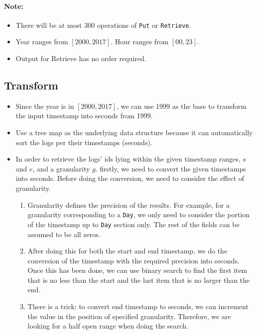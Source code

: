\paragraph{Note:}

\begin{itemize}
\item There will be at most 300 operations of \texttt{Put} or \texttt{Retrieve}.
\item Year ranges from $[2000,2017]$. Hour ranges from $[00,23]$.
\item Output for Retrieve has no order required.
\end{itemize}

\subsection{Transform}
\begin{itemize}
\item Since the year is in $[2000,2017]$, we can use 1999 as the base to transform the input timestamp into seconds from 1999.
\item Use a tree map as the underlying data structure because it can automatically sort the logs per their timestamps (seconds).
\item In order to retrieve the logs' ids lying within the given timestamp ranges, $s$ and $e$, and a granularity $g$. firstly, we need to convert the given timestamps into seconds. Before doing the conversion, we need to consider the effect of granularity.
 \begin{enumerate}
\item Granularity defines the precision of the results. For example, for a granularity corresponding to a \texttt{Day}, we only need to consider the portion of the timestamp up to \texttt{Day} section only. The rest of the fields can be assumed to be all zeros. 
\item After doing this for both the start and end timestamp, we do the conversion of the timestamp with the required precision into seconds. Once this has been done, we can use binary search to find the first item that is no less than the start and the last item that is no larger than the end.
\item There is a trick: to convert end timestamp to seconds, we can increment the value in the position of specified granularity. Therefore, we are looking for a half open range when doing the search.
\end{enumerate}
\end{itemize}
